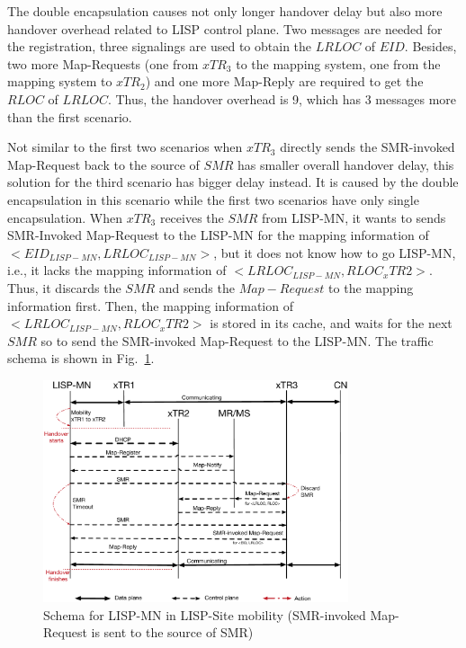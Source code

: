 The double encapsulation causes not only longer handover delay but also more handover overhead related to LISP control plane. Two messages are needed for the registration, three signalings are used to obtain the $LRLOC$ of $EID$. Besides, two more Map-Requests (one from $xTR_3$ to the mapping system, one from the mapping system to $xTR_2$) and one more Map-Reply are required to get the $RLOC$ of $LRLOC$. Thus, the handover overhead is 9, which has 3 messages more than the first scenario.

Not similar to the first two scenarios when $xTR_3$ directly sends the SMR-invoked Map-Request back to the source of $SMR$ has smaller overall handover delay, this solution for the third scenario has bigger delay instead. It is caused by the double encapsulation in this scenario while the first two scenarios have only single encapsulation. When $xTR_3$ receives the $SMR$ from LISP-MN, it wants to sends SMR-Invoked Map-Request to the LISP-MN for the mapping information of $<EID_{LISP-MN}, LRLOC_{LISP-MN}>$, but it does not know how to go LISP-MN, i.e., it lacks the mapping information of $<LRLOC_{LISP-MN}, RLOC_xTR2>$. Thus, it discards the $SMR$ and sends the $Map-Request$ to the mapping information first. Then, the mapping information of $<LRLOC_{LISP-MN}, RLOC_xTR2>$ is stored in its cache, and waits for the next $SMR$ so to send the SMR-invoked Map-Request to the LISP-MN. The traffic schema is shown in Fig.~\ref{Mobility_double_encap_schema_SMR_askxTR_simplify}.
\begin{figure}[!th]
	\centering
	\includegraphics[width=0.8\textwidth]{Pics/Mobility_double_encap_schema_SMR_askxTR_simplify}
	\caption{Schema for LISP-MN in LISP-Site mobility (SMR-invoked Map-Request is sent to the source of SMR)}
	\label{Mobility_double_encap_schema_SMR_askxTR_simplify}
\end{figure}

